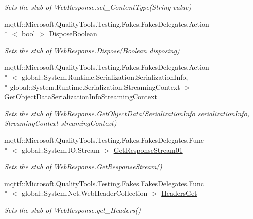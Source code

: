 \begin{DoxyCompactItemize}
\begin{DoxyCompactList}\small\item\em Sets the stub of Web\-Response.\-set\-\_\-\-Content\-Type(\-String value)\end{DoxyCompactList}\item 
mqttf\-::\-Microsoft.\-Quality\-Tools.\-Testing.\-Fakes.\-Fakes\-Delegates.\-Action\\*
$<$ bool $>$ \hyperlink{class_system_1_1_net_1_1_fakes_1_1_stub_web_response_aeb26869c6ec183bc4ec3930c14c6b4aa}{Dispose\-Boolean}
\begin{DoxyCompactList}\small\item\em Sets the stub of Web\-Response.\-Dispose(\-Boolean disposing)\end{DoxyCompactList}\item 
mqttf\-::\-Microsoft.\-Quality\-Tools.\-Testing.\-Fakes.\-Fakes\-Delegates.\-Action\\*
$<$ global\-::\-System.\-Runtime.\-Serialization.\-Serialization\-Info, \\*
global\-::\-System.\-Runtime.\-Serialization.\-Streaming\-Context $>$ \hyperlink{class_system_1_1_net_1_1_fakes_1_1_stub_web_response_a42910829eedb4208946d7f6360c5d729}{Get\-Object\-Data\-Serialization\-Info\-Streaming\-Context}
\begin{DoxyCompactList}\small\item\em Sets the stub of Web\-Response.\-Get\-Object\-Data(\-Serialization\-Info serialization\-Info, Streaming\-Context streaming\-Context)\end{DoxyCompactList}\item 
mqttf\-::\-Microsoft.\-Quality\-Tools.\-Testing.\-Fakes.\-Fakes\-Delegates.\-Func\\*
$<$ global\-::\-System.\-I\-O.\-Stream $>$ \hyperlink{class_system_1_1_net_1_1_fakes_1_1_stub_web_response_a1d8adcbe7ab1f10c6405679dfffa3afd}{Get\-Response\-Stream01}
\begin{DoxyCompactList}\small\item\em Sets the stub of Web\-Response.\-Get\-Response\-Stream()\end{DoxyCompactList}\item 
mqttf\-::\-Microsoft.\-Quality\-Tools.\-Testing.\-Fakes.\-Fakes\-Delegates.\-Func\\*
$<$ global\-::\-System.\-Net.\-Web\-Header\-Collection $>$ \hyperlink{class_system_1_1_net_1_1_fakes_1_1_stub_web_response_aababe088e569e27112ab1692050dff30}{Headers\-Get}
\begin{DoxyCompactList}\small\item\em Sets the stub of Web\-Response.\-get\-\_\-\-Headers()\end{DoxyCompactList}\item 

\end{DoxyCompactItemize}
